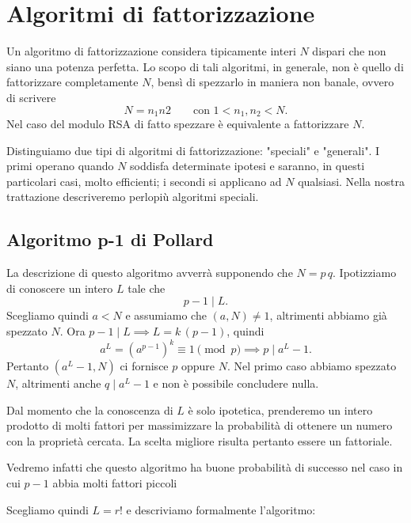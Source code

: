\section{Algoritmi di fattorizzazione}

	Un algoritmo di fattorizzazione considera tipicamente interi \(N\) dispari che non siano una potenza perfetta.
	Lo scopo di tali algoritmi, in generale, non è quello di fattorizzare completamente \(N\), bensì di spezzarlo in maniera non banale, ovvero di scrivere
		\[
		N = n_1 n2 \qquad\text{con }1 < n_1,n_2 < N.
		\]
	Nel caso del modulo RSA di fatto spezzare è equivalente a fattorizzare \(N\).

	Distinguiamo due tipi di algoritmi di fattorizzazione: "speciali" e "generali".
	I primi operano quando \(N\) soddisfa determinate ipotesi e saranno, in questi particolari casi, molto efficienti; i secondi si applicano ad \(N\) qualsiasi. Nella nostra trattazione descriveremo perlopiù algoritmi speciali.

	\subsection{Algoritmo p-1 di Pollard}

	La descrizione di questo algoritmo avverrà supponendo che \(N=p\,q\).
	Ipotizziamo di conoscere un intero \(L\) tale che
		\[
		p-1 \mid L.
		\]
	Scegliamo quindi \(a<N\) e assumiamo che \((a,N)\neq 1\), altrimenti abbiamo già spezzato \(N\). Ora \(p-1 \mid L \implies L=k\,(p-1)\), quindi
		\[
		a^L = {(a^{p-1})}^k \equiv 1 \pmod{p} \implies p \mid a^L-1.
		\]
	Pertanto \((a^L-1,N)\) ci fornisce \(p\) oppure \(N\).
	Nel primo caso abbiamo spezzato \(N\), altrimenti anche \(q\mid a^L-1\) e non è possibile concludere nulla.

	Dal momento che la conoscenza di \(L\) è solo ipotetica, prenderemo un intero prodotto di molti fattori per massimizzare la probabilità di ottenere un numero con la proprietà cercata.
	La scelta migliore risulta pertanto essere un fattoriale.

	\begin{oss}
	Vedremo infatti che questo algoritmo ha buone probabilità di successo nel caso in cui \(p-1\) abbia molti fattori piccoli
	\end{oss}
	\noindent
	Scegliamo quindi \(L=r!\) e descriviamo formalmente l'algoritmo:

	\begin{algorithmic}[1]
	\Statex
			\State {}
		\EndIf
	\EndWhile	
	\end{algorithmic}


